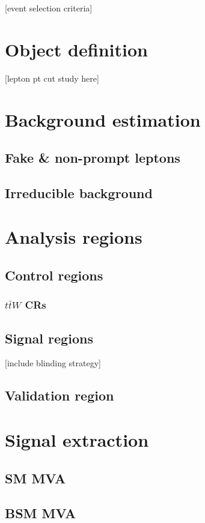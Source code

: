\documentclass[../thesis.tex]{subfiles}
\begin{document}
\vspace{-1\baselineskip}

[event selection criteria]
\section{Object definition}
\label{sec:objdef}
[lepton pt cut study here]
\section{Background estimation}
\label{sec:bg}
\subsection{Fake \& non-prompt leptons}
\subsection{Irreducible background}
\section{Analysis regions}
\label{sec:regions}
\subsection{Control regions}
\subsubsection*{$t\bar{t}W$ CRs}
\subsection{Signal regions}
[include blinding strategy]
\subsection{Validation region}

\section{Signal extraction}
\label{sec:mva}
\subsection*{SM MVA}
\subsection*{BSM MVA}
\end{document}
